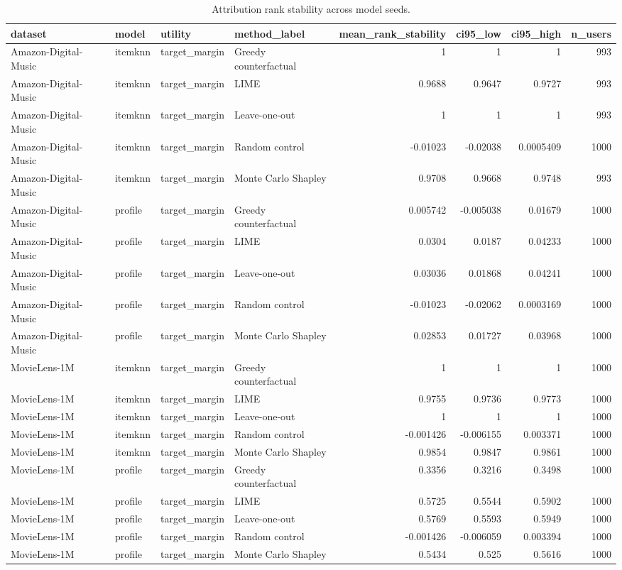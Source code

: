 \begin{table}[t]\centering
\caption{Attribution rank stability across model seeds.}\label{tab:stability}
\begin{tabular}{llllrrrr}
\toprule
dataset & model & utility & method\_label & mean\_rank\_stability & ci95\_low & ci95\_high & n\_users \\
\midrule
Amazon-Digital-Music & itemknn & target\_margin & Greedy counterfactual & 1 & 1 & 1 & 993 \\
Amazon-Digital-Music & itemknn & target\_margin & LIME & 0.9688 & 0.9647 & 0.9727 & 993 \\
Amazon-Digital-Music & itemknn & target\_margin & Leave-one-out & 1 & 1 & 1 & 993 \\
Amazon-Digital-Music & itemknn & target\_margin & Random control & -0.01023 & -0.02038 & 0.0005409 & 1000 \\
Amazon-Digital-Music & itemknn & target\_margin & Monte Carlo Shapley & 0.9708 & 0.9668 & 0.9748 & 993 \\
Amazon-Digital-Music & profile & target\_margin & Greedy counterfactual & 0.005742 & -0.005038 & 0.01679 & 1000 \\
Amazon-Digital-Music & profile & target\_margin & LIME & 0.0304 & 0.0187 & 0.04233 & 1000 \\
Amazon-Digital-Music & profile & target\_margin & Leave-one-out & 0.03036 & 0.01868 & 0.04241 & 1000 \\
Amazon-Digital-Music & profile & target\_margin & Random control & -0.01023 & -0.02062 & 0.0003169 & 1000 \\
Amazon-Digital-Music & profile & target\_margin & Monte Carlo Shapley & 0.02853 & 0.01727 & 0.03968 & 1000 \\
MovieLens-1M & itemknn & target\_margin & Greedy counterfactual & 1 & 1 & 1 & 1000 \\
MovieLens-1M & itemknn & target\_margin & LIME & 0.9755 & 0.9736 & 0.9773 & 1000 \\
MovieLens-1M & itemknn & target\_margin & Leave-one-out & 1 & 1 & 1 & 1000 \\
MovieLens-1M & itemknn & target\_margin & Random control & -0.001426 & -0.006155 & 0.003371 & 1000 \\
MovieLens-1M & itemknn & target\_margin & Monte Carlo Shapley & 0.9854 & 0.9847 & 0.9861 & 1000 \\
MovieLens-1M & profile & target\_margin & Greedy counterfactual & 0.3356 & 0.3216 & 0.3498 & 1000 \\
MovieLens-1M & profile & target\_margin & LIME & 0.5725 & 0.5544 & 0.5902 & 1000 \\
MovieLens-1M & profile & target\_margin & Leave-one-out & 0.5769 & 0.5593 & 0.5949 & 1000 \\
MovieLens-1M & profile & target\_margin & Random control & -0.001426 & -0.006059 & 0.003394 & 1000 \\
MovieLens-1M & profile & target\_margin & Monte Carlo Shapley & 0.5434 & 0.525 & 0.5616 & 1000 \\
\bottomrule
\end{tabular}
\end{table}
